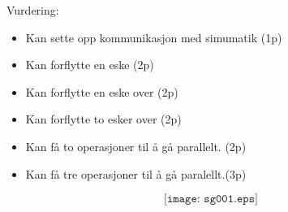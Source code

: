 Vurdering:
\begin{itemize}[noitemsep]
	\item Kan sette opp kommunikasjon med simumatik (1p)
	\item Kan forflytte en eske (2p)
	\item Kan forflytte en eske over (2p)
	\item Kan forflytte to esker over (2p)
	\item Kan få to operasjoner til å gå parallelt. (2p)
	\item Kan få tre operasjoner til å gå paralellt.(3p)
\end{itemize}
$$\texttt{[image: sg001.eps]}$$

\vskip 5pt 


